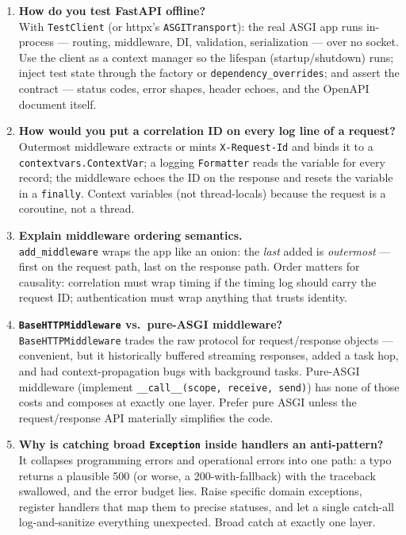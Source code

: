 \begin{enumerate}[label=\textbf{Q\arabic*.}, leftmargin=1.3cm, itemsep=0.8em]
\item \textbf{How do you test FastAPI offline?}\\
With \texttt{TestClient} (or httpx's \texttt{ASGITransport}): the real ASGI
app runs in-process --- routing, middleware, DI, validation, serialization
--- over no socket. Use the client as a context manager so the lifespan
(startup/shutdown) runs; inject test state through the factory or
\texttt{dependency\_overrides}; and assert the contract --- status codes,
error shapes, header echoes, and the OpenAPI document itself.

\item \textbf{How would you put a correlation ID on every log line of a
request?}\\
Outermost middleware extracts or mints \texttt{X-Request-Id} and binds it to
a \texttt{contextvars.ContextVar}; a logging \texttt{Formatter} reads the
variable for every record; the middleware echoes the ID on the response and
resets the variable in a \texttt{finally}. Context variables (not
thread-locals) because the request is a coroutine, not a thread.

\item \textbf{Explain middleware ordering semantics.}\\
\texttt{add\_middleware} wraps the app like an onion: the \emph{last} added
is \emph{outermost} --- first on the request path, last on the response
path. Order matters for causality: correlation must wrap timing if the
timing log should carry the request ID; authentication must wrap anything
that trusts identity.

\item \textbf{\texttt{BaseHTTPMiddleware} vs.\ pure-ASGI middleware?}\\
\texttt{BaseHTTPMiddleware} trades the raw protocol for request/response
objects --- convenient, but it historically buffered streaming responses,
added a task hop, and had context-propagation bugs with background tasks.
Pure-ASGI middleware (implement \texttt{\_\_call\_\_(scope, receive, send)})
has none of those costs and composes at exactly one layer. Prefer pure ASGI
unless the request/response API materially simplifies the code.

\item \textbf{Why is catching broad \texttt{Exception} inside handlers an
anti-pattern?}\\
It collapses programming errors and operational errors into one path: a
typo returns a plausible 500 (or worse, a 200-with-fallback) with the
traceback swallowed, and the error budget lies. Raise specific domain
exceptions, register handlers that map them to precise statuses, and let a
single catch-all log-and-sanitize everything unexpected. Broad catch at
exactly one layer.


\end{enumerate}
